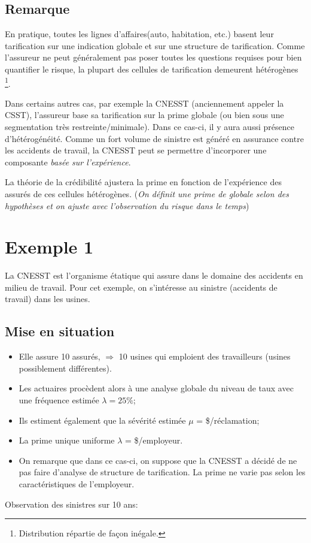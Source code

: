 \documentclass[11pt,french]{report}
\begin{document}
\subsection*{Remarque}
En pratique, toutes les lignes d'affaires(auto, habitation, etc.) basent leur tarification sur une indication globale et sur une structure de tarification. 
Comme l'assureur ne peut généralement pas poser toutes les questions requises pour bien quantifier le risque, la plupart des cellules de tarification demeurent hétérogènes \footnote{Distribution répartie de façon inégale.}. 

Dans certains autres cas, par exemple la CNESST (anciennement appeler la CSST), l'assureur base sa tarification sur la prime globale (ou bien sous une segmentation très restreinte/minimale). Dans ce cas-ci, il y aura aussi présence d'hétérogénéité. Comme un fort volume de sinistre est généré en assurance contre les accidents de travail, la CNESST peut se permettre d'incorporer une composante \emph{basée sur l'expérience}.

La théorie de la crédibilité ajustera la prime en fonction de l'expérience des assurés de ces cellules hétérogènes. (\textit{On définit une prime de globale selon des hypothèses et on ajuste avec l'observation du risque dans le temps})

\section{Exemple 1}

La CNESST est l'organisme étatique qui assure dans le domaine des accidents en milieu de travail. Pour cet exemple, on s'intéresse au sinistre (accidents de travail) dans les usines.
\subsection{Mise en situation}
\begin{itemize}
\item Elle assure 10 assurés, $ \Longrightarrow $ 10 usines qui emploient des travailleurs (usines possiblement différentes).
\item Les actuaires procèdent alors à une analyse globale du niveau de taux avec une fréquence estimée $\lambda = 25 \%$;
\item Ils estiment également que la sévérité estimée $\mu$ =  \$/réclamation; 
\item La prime unique uniforme $\lambda$ =   \$/employeur.
\item On remarque que dans ce cas-ci, on suppose que la CNESST a décidé de ne pas faire d'analyse de structure de tarification. La prime ne varie pas selon les caractéristiques de l'employeur.
\end{itemize}
\bigskip
Observation des sinistres sur 10 ans:
\\
\end{document}
